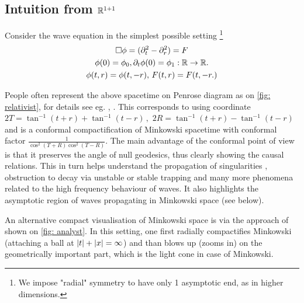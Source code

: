 \documentclass[11pt, oneside]{amsart}
\begin{document}
	\subsection{Intuition from $\mathbb{R}^{1+1}$}\label{intuition from 1+1}

	Consider the wave equation in the simplest possible setting \footnote{We impose "radial" symmetry to have only 1 asymptotic end, as in higher dimensions.}
	\begin{equation}\label{1+1 linear wave}
		\begin{gathered}
			\Box\phi=(\partial_t^2-\partial_r^2)=F\\
			\phi(0)=\phi_0,\partial_t\phi(0)=\phi_1:\mathbb{R}\to\mathbb{R}.\\
			\phi(t,r)=\phi(t,-r),\, F(t,r)=F(t,-r.)
		\end{gathered}
	\end{equation}
	
	People often represent the above spacetime on Penrose diagram as on \cref{fig: relativist}, for details see eg. \cite{Dafermos2008}, \cite{wald_general_1984}. This corresponds to using coordinate $2T=\tan^{-1}(t+r)+\tan^{-1}(t-r)\,,$ $2R=\tan^{-1}(t+r)-\tan^{-1}(t-r)$ and is a conformal compactification of Minkowski spacetime with conformal factor $\frac{1}{\cos^2(T+R)\cos^2(T-R)}$. The main advantage of the conformal point of view is that it preserves the angle of null geodesics, thus clearly showing the causal relations. This in turn helps understand the propagation of singularities \cite{baskin_asymptotics_2018}, obstruction to decay via unstable \cite{Dafermos2008} or stable trapping \cite{benomio_stable_2021} and many more phenomena related to the high frequency behaviour of waves.  It also highlights the asymptotic region of waves propagating in Minkowski space (see below).
	
	An alternative compact visualisation of Minkowski space is via the approach of \cite{baskin_asymptotics_2018} shown on \cref{fig: analyst}. In this setting, one first radially compactifies Minkowski (attaching a ball at $\left\lvert t\right\rvert+\left\lvert x\right\rvert=\infty$) and than blows up (zooms in) on the geometrically important part, which is the light cone in case of Minkowski. 
	
\end{document}
